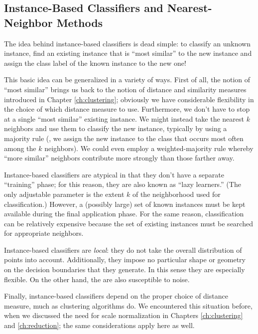 \subsection{Instance-Based Classifiers and Nearest-Neighbor Methods}


The idea behind instance-based classifiers is dead simple: to classify
an unknown instance, find an existing instance that is ``most similar''
to the new instance and assign the class label of the known instance
to the new one!

This basic idea can be generalized in a variety of ways. First of all,
the notion of ``most similar'' brings us back to the notion of
distance and similarity measures introduced in Chapter
\ref{ch:clustering}; obviously we have considerable flexibility in the
choice of which distance measure to use. Furthermore, we don't have to
stop at a single ``most similar'' existing instance.  We might instead
take the nearest $k$ neighbors and use them to classify the new
instance, typically by using a majority rule (\ie, we assign the new
instance to the class that occurs most often among the $k$ neighbors).
We could even employ a weighted-majority rule whereby ``more similar''
neighbors contribute more strongly than those farther away.

Instance-based classifiers are atypical in that they don't have a
separate ``training'' phase; for this reason, they are also known as
``lazy learners.'' (The only adjustable parameter is the extent $k$ of
the neighborhood used for classification.)  However, a (possibly
large) set of known instances must be kept available during the final
application phase.  For the same reason, classification can be
relatively expensive because the set of existing instances must be
searched for appropriate neighbors.

Instance-based classifiers are \emph{local}: they do not take the 
overall distribution of points into account. Additionally, they 
impose no particular shape or geometry on the decision boundaries
that they generate. In this sense they are especially flexible.
On the other hand, the are also susceptible to noise. 

Finally, instance-based classifiers depend on the proper choice of
distance measure, much as clustering algorithms do. We encountered
this situation before, when we discussed the need for scale
normalization in Chapters \ref{ch:clustering} and \ref{ch:reduction};
the same considerations apply here as well.


